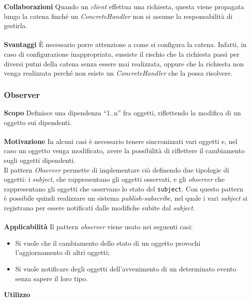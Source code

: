 \textbf{Collaborazioni}		Quando un \textit{client} effettua una richiesta, questa viene propagata lungo la catena finché un \textit{ConcreteHandler} non si assume la responsabilità di gestirla.
\\\\
\textbf{Svantaggi}	È necessario porre attenzione a come si configura la catena. Infatti, in caso di configurazione inappropriata, sussiste il rischio che la richiesta passi per diversi putni della catena senza essere mai realizzata, oppure che la richiesta non venga realizzata perché non esiste un \textit{ConcreteHandler} che la possa risolvere.


\subsubsection{Observer}
\textbf{Scopo}	Definisce una dipendenza “1..n” fra oggetti, riflettendo la modifica di un oggetto sui dipendenti.
\\\\
\textbf{Motivazione}	In alcuni casi è necessario tenere sincronizzati vari oggetti e, nel caso un oggetto venga modificato, avere la possibilità di riflettere il cambiamento sugli oggetti dipendenti. \\ Il pattern \textit{Observer} permette di implementare ciò definendo due tipologie di oggetti: i \textit{subject}, che rappresentano gli oggetti osservati, e gli \textit{observer} che rappresentano gli oggetti che osservano lo stato del \texttt{subject}. Con questo pattern è possibile quindi realizzare un sistema \textit{publish-subscribe}, nel quale i vari \textit{subject} si registrano per essere notificati dalle modifiche subite dal \textit{subject}.
\\\\
\textbf{Applicabilità}	Il pattern \textit{observer} viene usato nei seguenti casi:
	\begin{itemize}
		\item Si vuole che il cambiamento dello stato di un oggetto provochi l'aggiornamento di altri oggetti;
		\item Si vuole notificare degli oggetti dell'avvenimento di un determinato evento senza sapere il loro tipo.
	\end{itemize}

\textbf{Utilizzo}